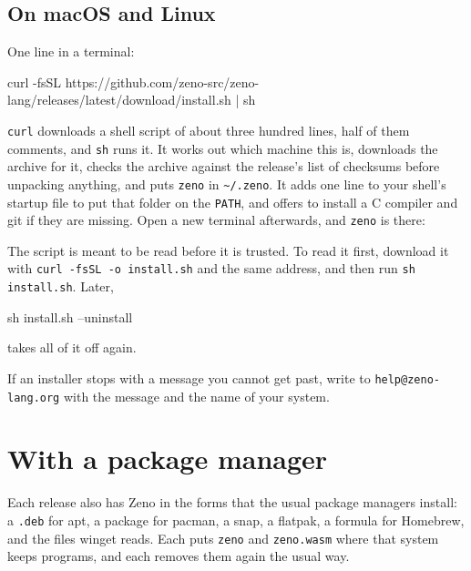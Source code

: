\subsection{On macOS and Linux}

One line in a terminal:

\begin{zenofrag}[lang=shell]
curl -fsSL https://github.com/zeno-src/zeno-lang/releases/latest/download/install.sh | sh
\end{zenofrag}

\verb|curl| downloads a shell script of about three hundred lines, half
of them comments, and \verb|sh| runs it. It works out which machine
this is, downloads the archive for it, checks the archive against the
release's list of checksums before unpacking anything, and puts
\verb|zeno| in \verb|~/.zeno|. It adds one line to your shell's
startup file to put that folder on the \verb|PATH|, and offers to
install a C compiler and git if they are missing. Open a new terminal
afterwards, and \verb|zeno| is there:


The script is meant to be read before it is trusted. To read it
first, download it with \verb|curl -fsSL -o install.sh| and the same
address, and then run \verb|sh install.sh|. Later,

\begin{zenofrag}[lang=shell]
sh install.sh --uninstall
\end{zenofrag}

\noindent takes all of it off again.

\begin{note}
If an installer stops with a message you cannot get past, write to
\texttt{help@zeno-lang.org} with the message and the name of your
system.
\end{note}

\section{With a package manager}

Each release also has Zeno in the forms that the usual package
managers install: a \verb|.deb| for apt, a package for pacman, a snap,
a flatpak, a formula for Homebrew, and the files winget reads. Each
puts \verb|zeno| and \verb|zeno.wasm| where that system keeps
programs, and each removes them again the usual way.

